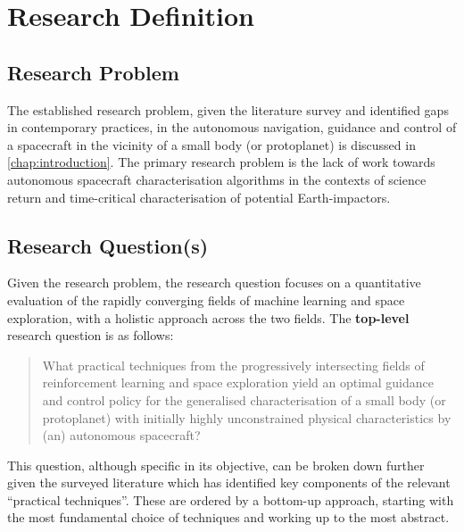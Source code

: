 

\newpage\section{Research Definition}

\subsection{Research Problem}

The established research problem, given the literature survey and identified gaps in contemporary practices, in the autonomous navigation, guidance and control of a spacecraft in the vicinity of a small body (or protoplanet) is discussed in \autoref{chap:introduction}. The primary research problem is the lack of work towards autonomous spacecraft characterisation algorithms in the contexts of science return and time-critical characterisation of potential Earth-impactors.





\subsection{Research Question(s)}

Given the research problem, the research question focuses on a quantitative evaluation of the rapidly converging fields of machine learning and space exploration, with a holistic approach across the two fields. The \textbf{top-level} research question is as follows:

\begin{quote}
    What practical techniques from the progressively intersecting fields of reinforcement learning and space exploration yield an optimal guidance and control policy for the generalised characterisation of a small body (or protoplanet) with initially highly unconstrained physical characteristics by (an) autonomous spacecraft?
\end{quote}

This question, although specific in its objective, can be broken down further given the surveyed literature which has identified key components of the relevant ``practical techniques''. These are ordered by a bottom-up approach, starting with the most fundamental choice of techniques and working up to the most abstract.

